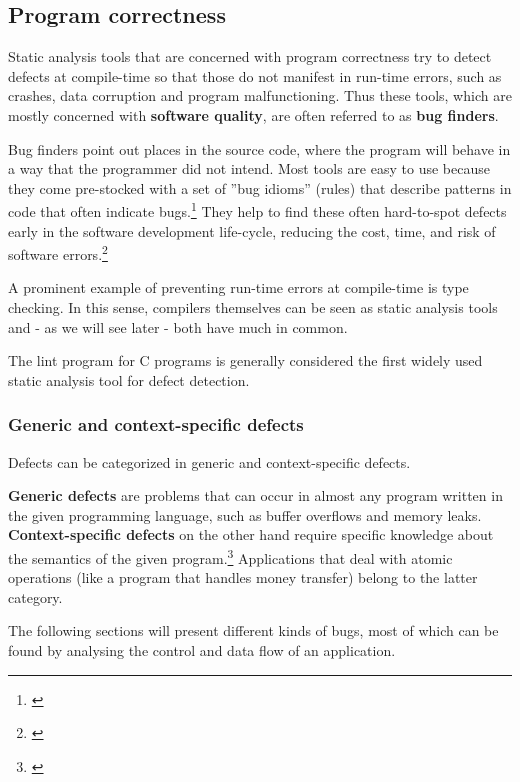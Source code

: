 \subsection{Program correctness}

Static analysis tools that are concerned with program correctness try to detect defects at compile-time so that those do not manifest in run-time errors, such as crashes, data corruption and program malfunctioning. Thus these tools, which are mostly concerned with \textbf{software quality}, are often referred to as \textbf{bug finders}.

Bug finders point out places in the source code, where the program will behave in a way that the programmer did not intend. Most tools are easy to use because they come pre-stocked with a set of ''bug idioms'' (rules) that describe patterns in code that often indicate bugs.\footnote{\citep[32]{SecureProgramming}} They help to find these often hard-to-spot defects early in the software development life-cycle, reducing the cost, time, and risk of software errors.\footnote{\citep{CovertySA}}

A prominent example of preventing run-time errors at compile-time is type checking. In this sense, compilers themselves can be seen as static analysis tools and - as we will see later - both have much in common.

The lint program for C programs is generally considered the first widely used static analysis tool for defect detection. 

\subsubsection{Generic and context-specific defects}

Defects can be categorized in generic and context-specific defects.

\textbf{Generic defects} are problems that can occur in almost any program written in the given programming language, such as buffer overflows and memory leaks. \textbf{Context-specific defects} on the other hand require specific knowledge about the semantics of the given program.\footnote{\citep[14]{SecureProgramming}} Applications that deal with atomic operations (like a program that handles money transfer) belong to the latter category.

The following sections will present different kinds of bugs, most of which can be found by analysing the control and data flow of an application.

